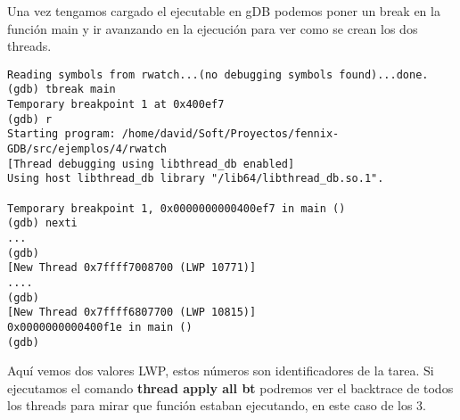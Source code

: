 Una vez tengamos cargado el ejecutable en gDB podemos poner un break en la función main y ir avanzando en la ejecución para ver como se crean los dos threads.
\begin{verbatim}
Reading symbols from rwatch...(no debugging symbols found)...done.
(gdb) tbreak main
Temporary breakpoint 1 at 0x400ef7
(gdb) r
Starting program: /home/david/Soft/Proyectos/fennix-GDB/src/ejemplos/4/rwatch 
[Thread debugging using libthread_db enabled]
Using host libthread_db library "/lib64/libthread_db.so.1".

Temporary breakpoint 1, 0x0000000000400ef7 in main ()
(gdb) nexti
...
(gdb) 
[New Thread 0x7ffff7008700 (LWP 10771)]
....
(gdb) 
[New Thread 0x7ffff6807700 (LWP 10815)]
0x0000000000400f1e in main ()
(gdb)
\end{verbatim}
Aquí vemos dos valores LWP, estos números son identificadores de la tarea. Si ejecutamos el comando \textbf{thread apply all bt} podremos ver el backtrace de todos los threads para mirar que función estaban ejecutando, en este caso de los 3.

